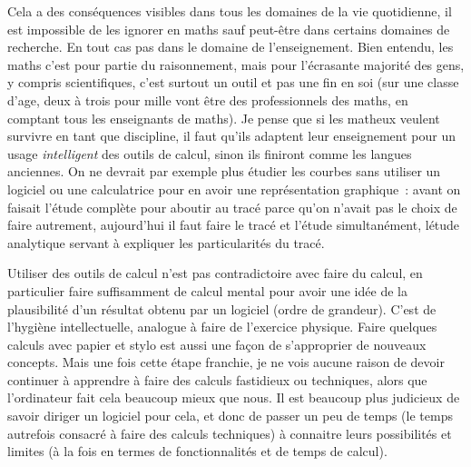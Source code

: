 \documentclass[a4paper,11pt]{book}
\begin{document}
\begin{giacjshere}
Cela a des cons\'equences
visibles dans tous les domaines de la vie quotidienne, il
est impossible de les ignorer en maths sauf peut-\^etre
dans certains domaines de recherche. En tout
cas pas dans le domaine de l'enseignement. Bien entendu,
les maths c'est pour partie du raisonnement, mais pour
l'\'ecrasante majorit\'e des gens, y compris scientifiques,
c'est surtout un outil et pas une fin en soi (sur une classe
d'age, deux \`a trois pour mille vont
\^etre des professionnels des maths, en comptant tous les
enseignants de maths). Je pense que si les matheux veulent survivre
en tant que discipline, il faut qu'ils adaptent leur enseignement
pour un usage {\em intelligent} des outils de calcul, sinon ils finiront
comme les langues anciennes. On ne devrait par exemple 
plus \'etudier les courbes sans utiliser un logiciel ou une
calculatrice pour en avoir une repr\'esentation graphique~: 
avant on faisait l'\'etude compl\`ete pour aboutir au trac\'e 
parce qu'on n'avait pas le choix de faire autrement, aujourd'hui il faut
faire le trac\'e et l'\'etude simultan\'ement, l\'etude analytique
servant \`a expliquer les particularit\'es du trac\'e.

Utiliser des outils de calcul n'est pas contradictoire avec faire
du calcul, en particulier faire suffisamment de calcul mental pour avoir
une id\'ee de la plausibilit\'e d'un r\'esultat obtenu par
un logiciel (ordre de grandeur). C'est
de l'hygi\`ene intellectuelle, analogue \`a faire de l'exercice
physique. Faire quelques calculs avec papier et stylo est aussi une
fa\c{c}on de s'approprier de nouveaux concepts. Mais une fois
cette \'etape franchie, je ne vois aucune raison de devoir
continuer \`a apprendre \`a faire des calculs fastidieux
ou techniques, alors que l'ordinateur fait cela beaucoup mieux
que nous. Il est beaucoup plus judicieux de savoir diriger
un logiciel pour cela, et donc de passer un peu de temps
(le temps autrefois consacr\'e \`a faire des calculs techniques)
\`a connaitre leurs possibilit\'es
et limites (\`a la fois en termes de fonctionnalit\'es et
de temps de calcul).


\end{giacjshere}
\end{document}
